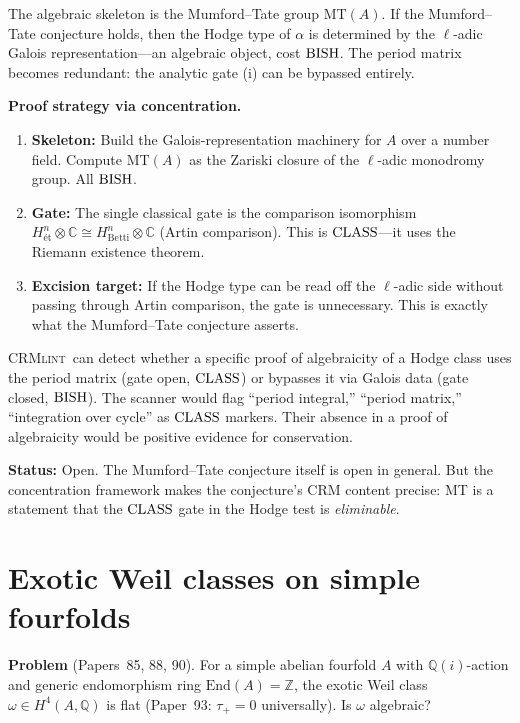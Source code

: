 \documentclass[11pt,a4paper]{article}
\theoremstyle{plain}
\theoremstyle{definition}
\newcommand{\BISH}{\textup{BISH}}
\newcommand{\CLASS}{\textup{CLASS}}
\newcommand{\CRMlint}{\textsc{CRMlint}}
\newcommand{\Z}{\mathbb{Z}}
\newcommand{\Q}{\mathbb{Q}}
\newcommand{\C}{\mathbb{C}}
\begin{document}
The algebraic skeleton is the Mumford--Tate group $\mathrm{MT}(A)$.
If the Mumford--Tate conjecture holds, then the Hodge type of $\alpha$
is determined by the $\ell$-adic Galois representation---an algebraic
object, cost $\BISH$.  The period matrix becomes redundant: the
analytic gate (i) can be bypassed entirely.

\medskip
\noindent\textbf{Proof strategy via concentration.}
\begin{enumerate}[nosep]
\item \textbf{Skeleton:} Build the Galois-representation machinery
  for $A$ over a number field.  Compute $\mathrm{MT}(A)$ as the
  Zariski closure of the $\ell$-adic monodromy group.  All $\BISH$.
\item \textbf{Gate:} The single classical gate is the comparison
  isomorphism $H^n_{\text{\'et}} \otimes \C \cong H^n_{\text{Betti}} \otimes \C$
  (Artin comparison).  This is $\CLASS$---it uses the Riemann
  existence theorem.
\item \textbf{Excision target:} If the Hodge type can be read off
  the $\ell$-adic side without passing through Artin comparison, the
  gate is unnecessary.  This is exactly what the Mumford--Tate
  conjecture asserts.
\end{enumerate}

\CRMlint\ can detect whether a specific proof of algebraicity of a
Hodge class uses the period matrix (gate open, $\CLASS$) or bypasses
it via Galois data (gate closed, $\BISH$).  The scanner would flag
``period integral,'' ``period matrix,'' ``integration over cycle'' as
$\CLASS$ markers.  Their absence in a proof of algebraicity would
be positive evidence for conservation.

\medskip
\noindent\textbf{Status:} Open.  The Mumford--Tate conjecture itself
is open in general.  But the concentration framework makes the
conjecture's CRM content precise: MT is a statement that the
$\CLASS$ gate in the Hodge test is \emph{eliminable}.

\section{Exotic Weil classes on simple fourfolds}\label{sec:exotic-weil}

\noindent\textbf{Problem} (Papers~85, 88, 90).
For a simple abelian fourfold $A$ with $\Q(i)$-action and generic
endomorphism ring $\mathrm{End}(A) = \Z$, the exotic Weil class
$\omega \in H^4(A, \Q)$ is flat (Paper~93: $\tau_+ = 0$ universally).
Is $\omega$ algebraic?
\end{document}

